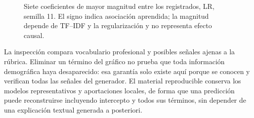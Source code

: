 \documentclass[11pt,a4paper,oneside]{report}
\begin{document}
\begin{figure}[htbp]\centering
{}
\caption[Siete coeficientes de mayor magnitud entre los registrados, LR, semilla 11]{Siete coeficientes de mayor magnitud entre los registrados, LR, semilla 11. El signo indica asociación aprendida; la magnitud depende de TF--IDF y la regularización y no representa efecto causal.}\label{fig:coeficientes}\end{figure}

La inspección compara vocabulario profesional y posibles señales ajenas a la rúbrica. Eliminar un término del gráfico no prueba que toda información demográfica haya desaparecido: esa garantía solo existe aquí porque se conocen y verifican todas las señales del generador. El material reproducible conserva los modelos representativos y aportaciones locales, de forma que una predicción puede reconstruirse incluyendo intercepto y todos sus términos, sin depender de una explicación textual generada a posteriori.
\end{document}
